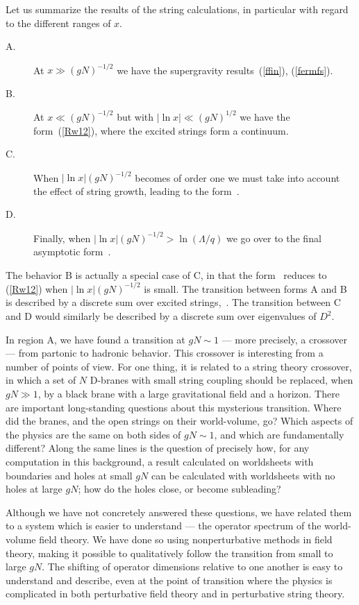 Let us summarize the results of the string calculations, in particular with
regard to the different ranges of $x$.
\begin{description}
\item[A.]
At $x \gg (gN)^{-1/2}$ we have the supergravity results~(\ref{ffin}),
(\ref{fermfs}).
\item[B.]
At $x \ll (gN)^{-1/2}$
but with $|\ln x| \ll (gN)^{1/2}$ we have the form~(\ref{Rw12}),
where the excited strings form a continuum.
\item[C.]
When $|\ln x| (gN)^{-1/2}$ becomes
of order one we must take into account the effect of string growth, 
leading to the
form~.
\item[D.]
Finally, when $|\ln x| (gN)^{-1/2} > \ln ( \Lambda/q)$ we go over to the final
asymptotic form~.
\end{description}
The behavior B is actually a special case of C, in that the
form~ reduces to (\ref{Rw12}) when $|\ln x| 
(gN)^{-1/2}$ is small.
The transition between forms A and B is described by a discrete sum 
over excited
strings,~.  The transition between C and D would similarly 
be described
by a discrete sum over eigenvalues of $D^2$.

In region A, we have found a transition at $gN\sim1$
--- more precisely, a crossover ---
from partonic to hadronic behavior.  This crossover
is interesting from a number
of points of view.  For one thing, it is related to a
string theory crossover, in which a set of $N$ D-branes
with small string coupling should be replaced,
when $gN\gg 1$, by a black brane with a large gravitational field
and a horizon.  There are important long-standing questions about
this mysterious
transition.  Where did the branes, and the open
strings on their world-volume, go?  Which aspects of the
physics are the same on both sides of $gN\sim1$, and which
are fundamentally different?  Along the same lines is the question
of precisely how, for any computation in this background, a result calculated
on worldsheets with boundaries
and holes at small $gN$ can be calculated
with worldsheets with no holes at large $gN$; how do the holes
close, or become subleading?

Although we have not concretely answered these questions, we have
related them to a system which is easier to understand --- the
operator spectrum of the world-volume field theory. We have done so using nonperturbative
methods in field theory, making it possible to qualitatively follow
the transition from small to large $gN$.  The shifting of operator
dimensions relative to one another is easy to understand and describe,
even at the point of transition where the physics is complicated in
both perturbative field theory and in perturbative string theory.

